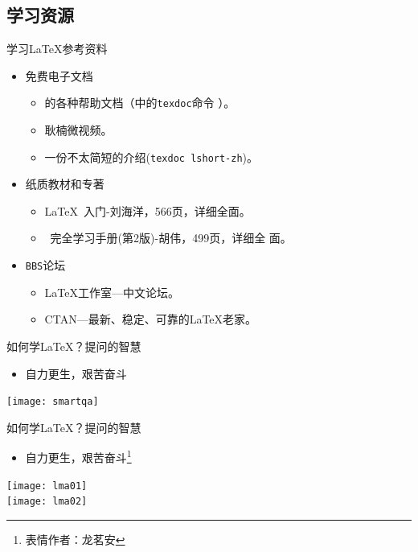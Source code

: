 \documentclass[fontset = none, xcolor=svgnames, t, aspectratio=169]{ctexbeamer}
\begin{document}
\subsection{学习资源}
\begin{frame}[t]{学习\LaTeX}{参考资料}
  \stretchon
  \begin{itemize}
  \item \alert{免费}电子文档
    \begin{itemize}
    \item \TeXLive 的各种帮助文档（\TeXLive 中的\alert{\texttt{texdoc}}命令
      ）。
    \item 耿楠微视频。
    \item 一份不太简短的{\LaTeXe}介绍(\texttt{texdoc lshort-zh})。
    \end{itemize}
  \item 纸质教材和专著
    \begin{itemize}
    \item {\LaTeX}~入门-刘海洋，566页，详细全面。
    \item {\LaTeXe}~完全学习手册(第2版)-胡伟，499页，详细全
      面。
    \end{itemize}
  \item \texttt{BBS}论坛
    \begin{itemize}
    \item {\LaTeX}工作室---中文论坛。  
    \item {CTAN}---最新、稳定、可靠的{\LaTeX}老家。    
    \end{itemize}
  \end{itemize}
  \stretchoff
\end{frame}

\begin{frame}{如何学\LaTeX ？}{提问的智慧}
  \stretchon
  \begin{itemize}
  \item 自力更生，艰苦奋斗
  \end{itemize}
  \centering
  \texttt{[image: smartqa]}
  \stretchoff
\end{frame}

\begin{frame}{如何学\LaTeX ？}{提问的智慧}
  \stretchon
  \begin{itemize}
  \item 自力更生，艰苦奋斗\footnote[frame]{表情作者：龙茗安}    
  \end{itemize}
  \centering
  \texttt{[image: lma01]}\\[4ex]
  \texttt{[image: lma02]}
  \stretchoff
\end{frame}
\end{document}
